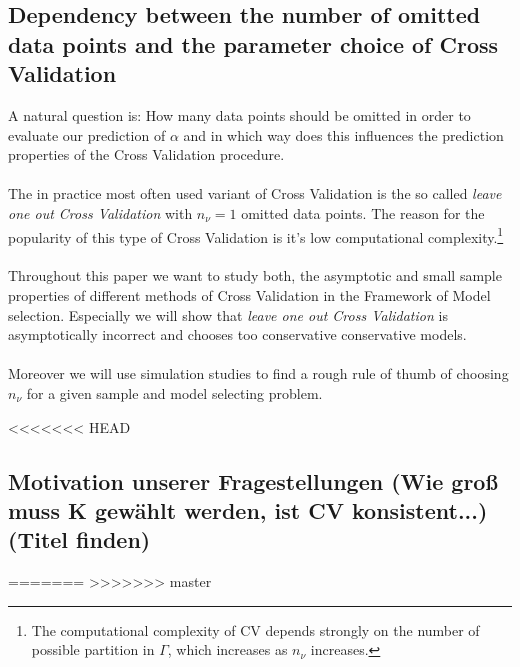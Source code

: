 \documentclass[Research_Module_ES.tex]{subfiles}
\begin{document}
\subsection{Dependency between the number of omitted data points and the  parameter choice of Cross Validation}
A natural question is: How many data points should be omitted in order to evaluate our prediction of $\alpha$ and in which way does this influences the prediction properties of the Cross Validation procedure.\\
\\
The in practice most often used variant of Cross Validation is the so called {\itshape leave one out Cross Validation} with $n_\nu=1$ omitted data points. The reason for the popularity of this type of Cross Validation is it's low computational complexity.\footnote{The computational complexity of CV depends strongly on the number of possible partition in $\Gamma$, which increases as $n_\nu$ increases.}\\
\\
Throughout this paper we want to study both, the asymptotic and small sample properties of different methods of Cross Validation in the Framework of Model selection. Especially we will show that {\itshape leave one out Cross Validation} is asymptotically incorrect and chooses too conservative conservative models.\\
\\
Moreover we will use simulation studies to find a rough rule of thumb of choosing $n_\nu$ for a given sample and model selecting problem.





<<<<<<< HEAD


\subsection{Motivation unserer Fragestellungen (Wie groß muss K gewählt werden, ist CV konsistent...)(Titel finden)}
=======
>>>>>>> master
\end{document}
